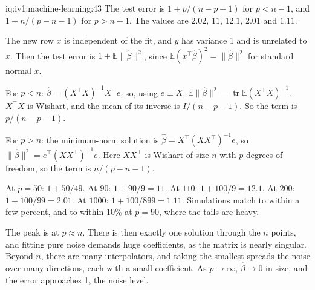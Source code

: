 \begin{solution}{iq:iv1:machine-learning:43}
The test error is $1 + p/(n - p - 1)$ for $p < n - 1$, and $1 + n/(p - n - 1)$ for $p > n + 1$. The values are $2.02$, $11$, $12.1$, $2.01$ and $1.11$.

The new row $x$ is independent of the fit, and $y$ has variance 1 and is unrelated to $x$. Then the test error is $1 + \mathbb{E}\|\hat{\beta}\|^2$, since $\mathbb{E}(x^\top\hat{\beta})^2 = \|\hat{\beta}\|^2$ for standard normal $x$.

For $p < n$: $\hat{\beta} = (X^\top X)^{-1}X^\top e$, so, using $e \perp X$, $\mathbb{E}\|\hat{\beta}\|^2 = \operatorname{tr}\mathbb{E}(X^\top X)^{-1}$. $X^\top X$ is Wishart, and the mean of its inverse is $I/(n - p - 1)$. So the term is $p/(n - p - 1)$.

For $p > n$: the minimum-norm solution is $\hat{\beta} = X^\top(XX^\top)^{-1}e$, so $\|\hat{\beta}\|^2 = e^\top(XX^\top)^{-1}e$. Here $XX^\top$ is Wishart of size $n$ with $p$ degrees of freedom, so the term is $n/(p - n - 1)$.

At $p = 50$: $1 + 50/49$. At $90$: $1 + 90/9 = 11$. At $110$: $1 + 100/9 = 12.1$. At $200$: $1 + 100/99 = 2.01$. At $1000$: $1 + 100/899 = 1.11$. Simulations match to within a few percent, and to within 10\% at $p = 90$, where the tails are heavy.

The peak is at $p \approx n$. There is then exactly one solution through the $n$ points, and fitting pure noise demands huge coefficients, as the matrix is nearly singular. Beyond $n$, there are many interpolators, and taking the smallest spreads the noise over many directions, each with a small coefficient. As $p \to \infty$, $\hat{\beta} \to 0$ in size, and the error approaches 1, the noise level.



\end{solution}


